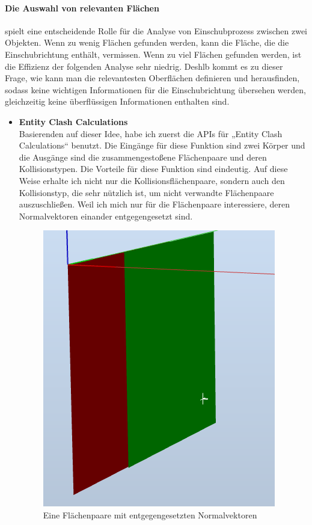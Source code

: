 \documentclass[14pt,a4paper,titlepage]{article}
\begin{document}
			\paragraph{Die Auswahl von relevanten Flächen}
			spielt eine entscheidende Rolle für die Analyse von Einschubprozess zwischen zwei Objekten. Wenn zu wenig Flächen gefunden werden, kann die Fläche, die die Einschubrichtung enthält, vermissen. Wenn zu viel Flächen gefunden werden, ist die Effizienz der folgenden Analyse sehr niedrig. Deshlb kommt es zu dieser Frage, wie kann man die relevantesten Oberflächen definieren und herausfinden, sodass keine wichtigen Informationen für die Einschubrichtung übersehen werden, gleichzeitig keine überflüssigen Informationen enthalten sind.
			\begin{itemize}
				\item 
				\textbf{Entity Clash Calculations}
				\\
				Basierenden auf dieser Idee, habe ich zuerst die APIs für „Entity Clash Calculations“ benutzt. Die Eingänge für diese Funktion sind zwei Körper und die Ausgänge sind die zusammengestoßene Flächenpaare und deren Kollisionstypen. Die Vorteile für diese Funktion sind eindeutig. Auf diese Weise erhalte ich nicht nur die Kollisionsflächenpaare, sondern auch den Kollisionstyp, die sehr nützlich ist, um nicht verwandte Flächenpaare auszuschließen. Weil ich mich nur für die Flächenpaare interessiere, deren Normalvektoren einander entgegengesetzt sind.
				\begin{figure}[h!]
					\centering
					\includegraphics[width=0.5\linewidth]{facepair.png}
					\caption{Eine Flächenpaare mit entgegengesetzten Normalvektoren}
				\end{figure}
			

\end{itemize}
\end{document}
